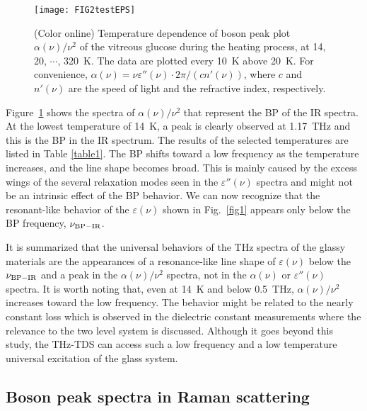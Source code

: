 \documentclass[%
 reprint,
superscriptaddress,
 amsmath,amssymb,
 aps,
prb,
]{revtex4-1}
\begin{document}
\begin{figure}
\texttt{[image: FIG2testEPS]}
\caption{(Color online) Temperature dependence of boson peak plot $\alpha(\nu)/\nu^{2}$ of the vitreous glucose during the heating process, at 14, 20, $\cdots$, 320~K. The data are plotted every 10~K above 20~K. For convenience, $\alpha(\nu) = \nu \varepsilon''(\nu) \cdot 2\pi/(cn'(\nu))$, where $c$ and $n'(\nu)$ are the speed of light and the refractive index, respectively.}
\label{fig2}
\end{figure}

Figure~\ref{fig2} shows the spectra of $\alpha(\nu)/\nu^{2}$ that represent the BP of the IR spectra.
At the lowest temperature of 14~K, a peak is clearly observed at 1.17~THz and this is the BP in the IR spectrum.
The results of the selected temperatures are listed in Table \ref{table1}.
The BP shifts toward a low frequency as the temperature increases, and the line shape becomes broad.
This is mainly caused by the excess wings of the several relaxation modes seen in the $\varepsilon''(\nu)$ spectra and might not be an intrinsic effect of the BP behavior.
We can now recognize that the resonant-like behavior of the $\varepsilon(\nu)$ shown in Fig.~\ref{fig1} appears only below the BP frequency, $\nu_{\rm BP-IR}$.

It is summarized that the universal behaviors of the THz spectra of the glassy materials are the appearances of a resonance-like line shape of $\varepsilon(\nu)$ below the $\nu_{\rm BP-IR}$ and a peak in the $\alpha(\nu)/\nu^{2}$ spectra, not in the $\alpha(\nu)$ or $\varepsilon''(\nu)$ spectra.
It is worth noting that, even at 14~K and below 0.5~THz, $\alpha(\nu)/\nu^{2}$ increases toward the low frequency. The behavior might be related to the nearly constant loss which is observed in the dielectric constant measurements \cite{Sidebottom2002} where the relevance to the two level system \cite{Phillips1972} is discussed. Although it goes beyond this study, the THz-TDS can access such a low frequency and a low temperature universal excitation of the glass system.



\subsection{Boson peak spectra in Raman scattering}
\end{document}
